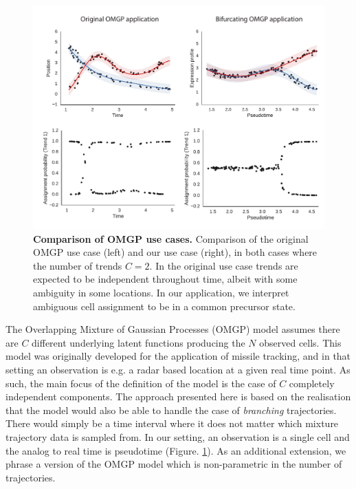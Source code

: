 \begin{figure}
    \centering
    \includegraphics[width=\textwidth]{"fig-omgp-apps"}
    \caption[Comparison of OMGP use cases]{\textbf{Comparison of OMGP use cases.} Comparison of the original OMGP use case (left) and our use case (right), in both cases where the number of trends \( C = 2 \). In the original use case trends are expected to be independent throughout time, albeit with some ambiguity in some locations. In our application, we interpret ambiguous cell assignment to be in a common precursor state.}
    \label{fig:omgpapps}
\end{figure}

The Overlapping Mixture of Gaussian Processes (OMGP) model \cite{Lazaro-Gredilla2012-ta} assumes there are $ C $ different underlying latent functions producing the $ N $ observed cells. This model was originally developed for the application of missile tracking, and in that setting an observation is e.g. a radar based location at a given real time point. As such, the main focus of the definition of the model is the case of $ C $ completely independent components. The approach presented here is based on the realisation that the model would also be able to handle the case of \textit{branching} trajectories. There would simply be a time interval where it does not matter which mixture trajectory data is sampled from. In our setting, an observation is a single cell and the analog to real time is pseudotime (Figure. \ref{fig:omgpapps}). As an additional extension, we phrase a version of the OMGP model which is non-parametric in the number of trajectories.

